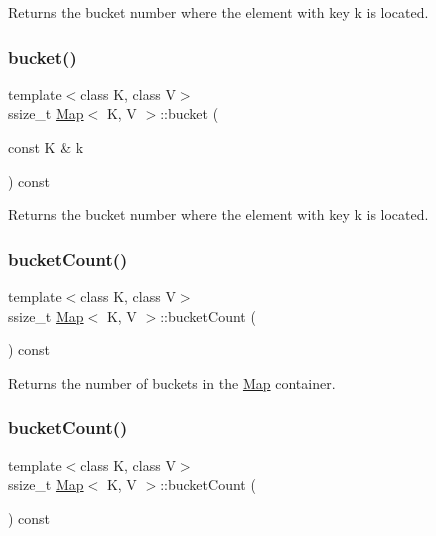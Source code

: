 Returns the bucket number where the element with key k is located. \mbox{\label{classMap_afb67ba82e34168ef9cc2c093e0782aee}} 
\subsubsection{\texorpdfstring{bucket()}{bucket()}\hspace{0.1cm}{\footnotesize\ttfamily [2/2]}}
{\footnotesize\ttfamily template$<$class K, class V$>$ \\
ssize\+\_\+t \hyperlink{classMap}{Map}$<$ K, V $>$\+::bucket (\begin{DoxyParamCaption}\item[{const K \&}]{k }\end{DoxyParamCaption}) const\hspace{0.3cm}{\ttfamily [inline]}}

Returns the bucket number where the element with key k is located. \mbox{\label{classMap_a7135028b2bcb299bd6dd71396cd5fb40}} 
\subsubsection{\texorpdfstring{bucket\+Count()}{bucketCount()}\hspace{0.1cm}{\footnotesize\ttfamily [1/2]}}
{\footnotesize\ttfamily template$<$class K, class V$>$ \\
ssize\+\_\+t \hyperlink{classMap}{Map}$<$ K, V $>$\+::bucket\+Count (\begin{DoxyParamCaption}{ }\end{DoxyParamCaption}) const\hspace{0.3cm}{\ttfamily [inline]}}

Returns the number of buckets in the \hyperlink{classMap}{Map} container. \mbox{\label{classMap_a7135028b2bcb299bd6dd71396cd5fb40}} 
\subsubsection{\texorpdfstring{bucket\+Count()}{bucketCount()}\hspace{0.1cm}{\footnotesize\ttfamily [2/2]}}
{\footnotesize\ttfamily template$<$class K, class V$>$ \\
ssize\+\_\+t \hyperlink{classMap}{Map}$<$ K, V $>$\+::bucket\+Count (\begin{DoxyParamCaption}{ }\end{DoxyParamCaption}) const\hspace{0.3cm}{\ttfamily [inline]}}

